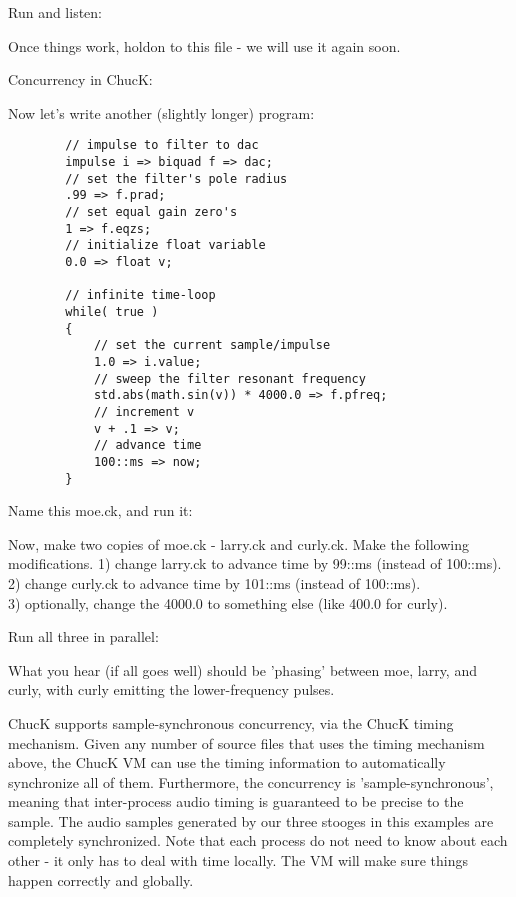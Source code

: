 Run and listen:

Once things work, holdon to this file - we will use it again soon. 

Concurrency in ChucK: 

Now let's write another (slightly longer) program:
\begin{verbatim}
        // impulse to filter to dac
        impulse i => biquad f => dac;
        // set the filter's pole radius
        .99 => f.prad;
        // set equal gain zero's
        1 => f.eqzs;
        // initialize float variable
        0.0 => float v;

        // infinite time-loop
        while( true )
        {
            // set the current sample/impulse
            1.0 => i.value;
            // sweep the filter resonant frequency
            std.abs(math.sin(v)) * 4000.0 => f.pfreq;
            // increment v
            v + .1 => v;
            // advance time
            100::ms => now;
        }
\end{verbatim}

Name this moe.ck, and run it:

Now, make two copies of moe.ck - larry.ck and curly.ck. Make the following modifications. 
1) change larry.ck to advance time by 99::ms (instead of 100::ms).\\
2) change curly.ck to advance time by 101::ms (instead of 100::ms).\\ 
3) optionally, change the 4000.0 to something else (like 400.0 for curly). 

Run all three in parallel:

What you hear (if all goes well) should be 'phasing' between moe, larry, and curly, 
with curly emitting the lower-frequency pulses. 

ChucK supports sample-synchronous concurrency, via the ChucK timing mechanism. Given any 
number of source files that uses the timing mechanism above, the ChucK VM can use the timing 
information to automatically synchronize all of them. Furthermore, the concurrency is 
'sample-synchronous', meaning that inter-process audio timing is guaranteed to be precise to 
the sample. The audio samples generated by our three stooges in this examples are completely 
synchronized. Note that each process do not need to know about each other - it only has to deal 
with time locally. The VM will make sure things happen correctly and globally. 
